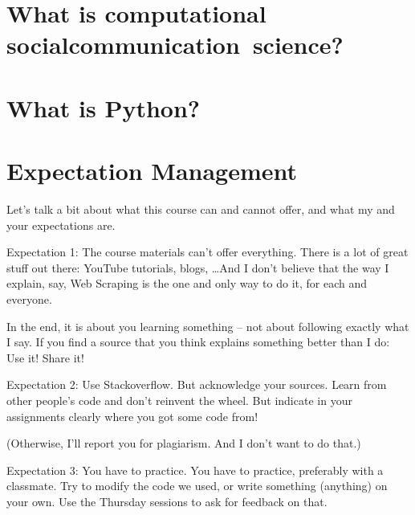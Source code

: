 \section[What is CSS\textbar CCS?]{What is computational \lbrack social\textbar communication\rbrack  ~science?}



\section{What is Python?}





\section{Expectation Management}


\begin{frame}[standout]
	Let's talk a bit about what this course can and cannot offer, and what my and your expectations are.
\end{frame}


\begin{frame}{Expectation 1: The course materials can't offer everything.}
There is a lot of great stuff out there: YouTube tutorials, blogs, \ldots And I don't believe that the way I explain, say, Web Scraping is the one and only way to do it, for each and everyone.

In the end, it is about you learning something -- not about following exactly what I say. If you find a source that you think explains something better than I do: Use it! Share it!
\end{frame}



\begin{frame}{Expectation 2: Use Stackoverflow. But acknowledge your sources.}
Learn from other people's code and don't reinvent the wheel. But indicate in your assignments clearly where you got some code from! 

(Otherwise, I'll report you for plagiarism. And I don't want to do that.)
\end{frame}





\begin{frame}{Expectation 3: You have to practice.}
	You have to practice, preferably with a classmate. Try to modify the code we used, or write something (anything) on your own. Use the Thursday sessions to ask for feedback on that.
\end{frame}




